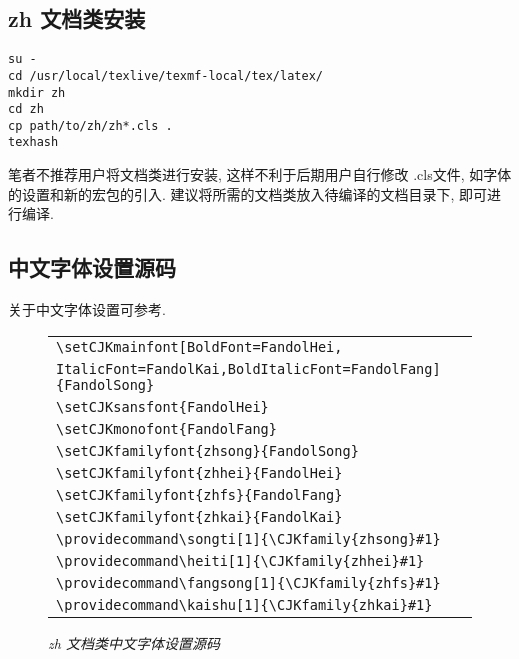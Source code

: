 \documentclass{zhart}
\begin{document}
\subsection{zh 文档类安装}

\begin{verbatim}
su -
cd /usr/local/texlive/texmf-local/tex/latex/
mkdir zh
cd zh
cp path/to/zh/zh*.cls .
texhash
\end{verbatim}

笔者不推荐用户将文档类进行安装, 这样不利于后期用户自行修改 .cls文件, 如字体的设置和新的宏包的引入. 建议将所需的文档类放入待编译的文档目录下, 即可进行编译. 


\subsection{中文字体设置源码}

关于中文字体设置可参考\cite{LaTeX2013}. 
\begin{figure}[H]
\centering
\caption*{\textit{zh 文档类中文字体设置源码}}
\begin{tabular}{l}
\hline
\verb|\setCJKmainfont[BoldFont=FandolHei,|\\
\verb|ItalicFont=FandolKai,BoldItalicFont=FandolFang]{FandolSong}|\\
\verb|\setCJKsansfont{FandolHei}|\\
\verb|\setCJKmonofont{FandolFang}|\\
\verb|\setCJKfamilyfont{zhsong}{FandolSong}|\\
\verb|\setCJKfamilyfont{zhhei}{FandolHei}|\\
\verb|\setCJKfamilyfont{zhfs}{FandolFang}|\\
\verb|\setCJKfamilyfont{zhkai}{FandolKai}|\\
\verb|\providecommand\songti[1]{\CJKfamily{zhsong}#1}|\\
\verb|\providecommand\heiti[1]{\CJKfamily{zhhei}#1}|\\
\verb|\providecommand\fangsong[1]{\CJKfamily{zhfs}#1}|\\
\verb|\providecommand\kaishu[1]{\CJKfamily{zhkai}#1}|\\
\hline
\end{tabular}
\end{figure}
\end{document}
